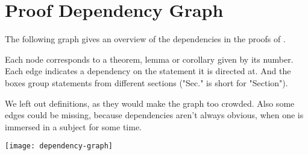 \appendix
\section{Proof Dependency Graph}\label{sec:dependency-graph}

The following graph gives an overview of the dependencies in the proofs of \cite{shitov2020sublinear}.

Each node corresponds to a theorem, lemma or corollary given by its number.
Each edge indicates a dependency on the statement it is directed at. 
And the boxes group statements from different sections ("Sec." is short for "Section").

We left out definitions, as they would make the graph too crowded. 
Also some edges could be missing, because dependencies aren't always obvious, when one is immersed in a subject for some time.

\texttt{[image: dependency-graph]}

\newpage